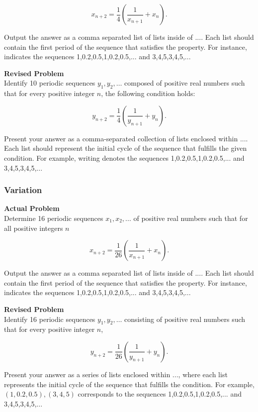$$x_{n+2} = \frac{1}{4} \left(\frac{1}{x_{n+1}} + x_n\right).$$

Output the answer as a comma separated list of lists inside of $\boxed{...}$. Each list should contain the first period of the sequence that satisfies the property. For instance,  indicates the sequences 1,0.2,0.5,1,0.2,0.5,... and 3,4,5,3,4,5,...

\textbf{Revised Problem}\\
Identify 10 periodic sequences $y_1, y_2, \ldots$ composed of positive real numbers such that for every positive integer $n$, the following condition holds:

$$y_{n+2} = \frac{1}{4} \left(\frac{1}{y_{n+1}} + y_n\right).$$

Present your answer as a comma-separated collection of lists enclosed within $\boxed{...}$. Each list should represent the initial cycle of the sequence that fulfills the given condition. For example, writing  denotes the sequences 1,0.2,0.5,1,0.2,0.5,... and 3,4,5,3,4,5,...

\subsubsection{Variation}
\textbf{Actual Problem}\\
Determine 16 periodic sequences $x_1, x_2, ...$ of positive real numbers such that for all positive integers $n$

$$x_{n+2} = \frac{1}{26} \left(\frac{1}{x_{n+1}} + x_n\right).$$

Output the answer as a comma separated list of lists inside of $\boxed{...}$. Each list should contain the first period of the sequence that satisfies the property. For instance,  indicates the sequences 1,0.2,0.5,1,0.2,0.5,... and 3,4,5,3,4,5,...

\textbf{Revised Problem}\\
Identify 16 periodic sequences \( y_1, y_2, \ldots \) consisting of positive real numbers such that for every positive integer \( n \),

$$y_{n+2} = \frac{1}{26} \left( \frac{1}{y_{n+1}} + y_n \right).$$

Present your answer as a series of lists enclosed within \(\boxed{...}\), where each list represents the initial cycle of the sequence that fulfills the condition. For example, \(\boxed{(1,0.2,0.5),(3,4,5)}\) corresponds to the sequences 1,0.2,0.5,1,0.2,0.5,... and 3,4,5,3,4,5,...

